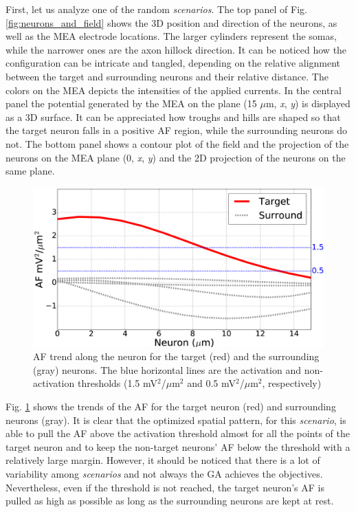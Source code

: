 \documentclass[conference]{IEEEtran}
\begin{document}
First, let us analyze one of the random \emph{scenarios}. The top
panel of Fig. \ref{fig:neurons_and_field} shows the 3D position and
direction of the neurons, as well as the MEA electrode locations.
The larger cylinders represent the somas, while the narrower ones
are the axon hillock direction. It can be noticed how the configuration
can be intricate and tangled, depending on the relative alignment
between the target and surrounding neurons and their relative distance.
The colors on the MEA depicts the intensities of the applied currents.
In the central panel the potential generated by the MEA on the plane
(15 $\mu$m,\emph{ x}, \emph{y}) is displayed as a 3D surface.
It can be appreciated how troughs and hills are shaped so that the
target neuron falls in a positive AF region, while the surrounding
neurons do not. The bottom panel shows a contour plot of the field
and the projection of the neurons on the MEA plane (0, \emph{x}, \emph{y})
and the 2D projection of the neurons on the same plane. \\
\begin{figure}[t]
\begin{centering}
\includegraphics[width=\linewidth]{figure_2_crop.eps}
\par\end{centering}

\caption{ \label{fig:af_trg_surr}AF trend along the neuron for the target (red) 
and the surrounding (gray) neurons. The blue horizontal
lines are the activation and non-activation thresholds (1.5 mV$^{2}$/$\mu$m$^{2}$
and 0.5 mV$^{2}$/$\mu$m$^{2}$, respectively)}


\end{figure}
Fig. \ref{fig:af_trg_surr} shows the trends of the AF for the target
neuron (red) and surrounding neurons (gray). It is clear that the
optimized spatial pattern, for this \emph{scenario}, is able to pull
the AF above the activation threshold almost for all the points of
the target neuron and to keep the non-target neurons' AF below the
threshold with a relatively large margin. However, it should be noticed
that there is a lot of variability among \emph{scenarios} and not
always the GA achieves the objectives. Nevertheless, even if the threshold
is not reached, the target neuron's AF is pulled as high as possible
as long as the surrounding neurons are kept at rest.
\end{document}
